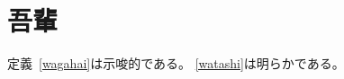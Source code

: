 \documentclass[]{sotsu}
\newcounter{definition}
\begin{document}
\setcounter{section}{3}

\section{吾輩}


\begin{definition}[吾輩である話]
    \label{wagahai}
\end{definition}

\begin{definition}
    \label{watashi}
\end{definition}


定義~\ref{wagahai}は示唆的である。
\cref{watashi}は明らかである。
\end{document}
